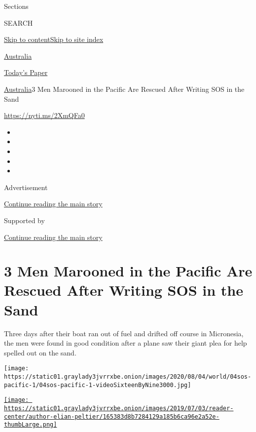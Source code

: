 Sections

SEARCH

\protect\hyperlink{site-content}{Skip to
content}\protect\hyperlink{site-index}{Skip to site index}

\href{https://www.nytimes3xbfgragh.onion/section/world/australia}{Australia}

\href{https://myaccount.nytimes3xbfgragh.onion/auth/login?response_type=cookie\&client_id=vi}{}

\href{https://www.nytimes3xbfgragh.onion/section/todayspaper}{Today's
Paper}

\href{/section/world/australia}{Australia}\textbar{}3 Men Marooned in
the Pacific Are Rescued After Writing SOS in the Sand

\url{https://nyti.ms/2XmQFa0}

\begin{itemize}
\item
\item
\item
\item
\item
\end{itemize}

Advertisement

\protect\hyperlink{after-top}{Continue reading the main story}

Supported by

\protect\hyperlink{after-sponsor}{Continue reading the main story}

\hypertarget{3-men-marooned-in-the-pacific-are-rescued-after-writing-sos-in-the-sand}{%
\section{3 Men Marooned in the Pacific Are Rescued After Writing SOS in
the
Sand}\label{3-men-marooned-in-the-pacific-are-rescued-after-writing-sos-in-the-sand}}

Three days after their boat ran out of fuel and drifted off course in
Micronesia, the men were found in good condition after a plane saw their
giant plea for help spelled out on the sand.

\texttt{[image: https://static01.graylady3jvrrxbe.onion/images/2020/08/04/world/04sos-pacific-1/04sos-pacific-1-videoSixteenByNine3000.jpg]}

\href{https://www.nytimes3xbfgragh.onion/by/elian-peltier}{\texttt{[image: https://static01.graylady3jvrrxbe.onion/images/2019/07/03/reader-center/author-elian-peltier/165383d8b7284129a185b6ca96e2a52e-thumbLarge.png]}}

